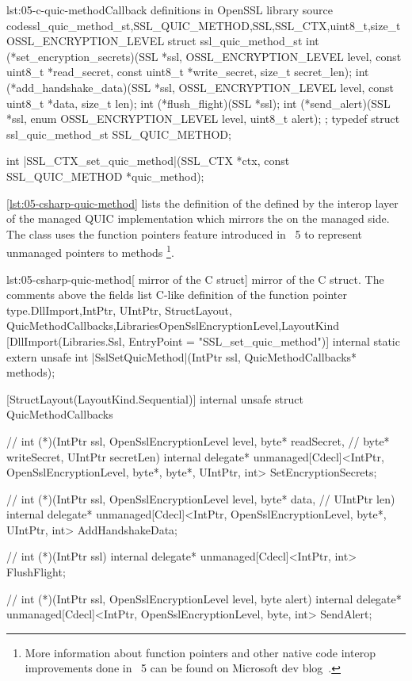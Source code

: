 \begin{myListingC}{lst:05-c-quic-method}{Callback definitions in OpenSSL library source code}{ssl_quic_method_st,SSL_QUIC_METHOD,SSL,SSL_CTX,uint8_t,size_t}{OSSL_ENCRYPTION_LEVEL}
struct ssl_quic_method_st {
    int (*set_encryption_secrets)(SSL *ssl, OSSL_ENCRYPTION_LEVEL level,
                                  const uint8_t *read_secret,
                                  const uint8_t *write_secret,
                                  size_t secret_len);
    int (*add_handshake_data)(SSL *ssl, OSSL_ENCRYPTION_LEVEL level,
                              const uint8_t *data, size_t len);
    int (*flush_flight)(SSL *ssl);
    int (*send_alert)(SSL *ssl, enum OSSL_ENCRYPTION_LEVEL level,
                      uint8_t alert);
};
typedef struct ssl_quic_method_st SSL_QUIC_METHOD;

int |SSL_CTX_set_quic_method|(SSL_CTX *ctx, const SSL_QUIC_METHOD *quic_method);
\end{myListingC}

\autoref{lst:05-csharp-quic-method} lists the definition of the  defined
by the interop layer of the managed QUIC implementation which mirrors the 
on the managed \dotnet{} side. The  class uses the \csharp{} function
pointers feature introduced in \dotnet{}~5 to represent unmanaged pointers to \csharp{} methods
\footnote{More information about \csharp{} function pointers and other native code interop
  improvements done in \dotnet{}~5 can be found on Microsoft dev
  blog~\cite{dotnet5interopimprovements}.}.

\begin{myListingCsharpNoPageBreak}{lst:05-csharp-quic-method}{[\csharp{} mirror of the  C struct]\csharp{} mirror of the  C struct. The comments above the fields list C-like definition of the function pointer type.}{DllImport,IntPtr, UIntPtr, StructLayout, QuicMethodCallbacks,Libraries}{OpenSslEncryptionLevel,LayoutKind}
[DllImport(Libraries.Ssl, EntryPoint = "SSL_set_quic_method")]
internal static extern unsafe int |SslSetQuicMethod|(IntPtr ssl,
    QuicMethodCallbacks* methods);

[StructLayout(LayoutKind.Sequential)]
internal unsafe struct QuicMethodCallbacks
{
    // int (*)(IntPtr ssl, OpenSslEncryptionLevel level, byte* readSecret,
    //         byte* writeSecret, UIntPtr secretLen)
    internal delegate* unmanaged[Cdecl]<IntPtr, OpenSslEncryptionLevel,
        byte*, byte*, UIntPtr, int> SetEncryptionSecrets;

    // int (*)(IntPtr ssl, OpenSslEncryptionLevel level, byte* data,
    //         UIntPtr len)
    internal delegate* unmanaged[Cdecl]<IntPtr, OpenSslEncryptionLevel,
        byte*, UIntPtr, int> AddHandshakeData;

    // int (*)(IntPtr ssl)
    internal delegate* unmanaged[Cdecl]<IntPtr, int> FlushFlight;

    // int (*)(IntPtr ssl, OpenSslEncryptionLevel level, byte alert)
    internal delegate* unmanaged[Cdecl]<IntPtr, OpenSslEncryptionLevel, byte,
        int> SendAlert;
}
\end{myListingCsharpNoPageBreak}

